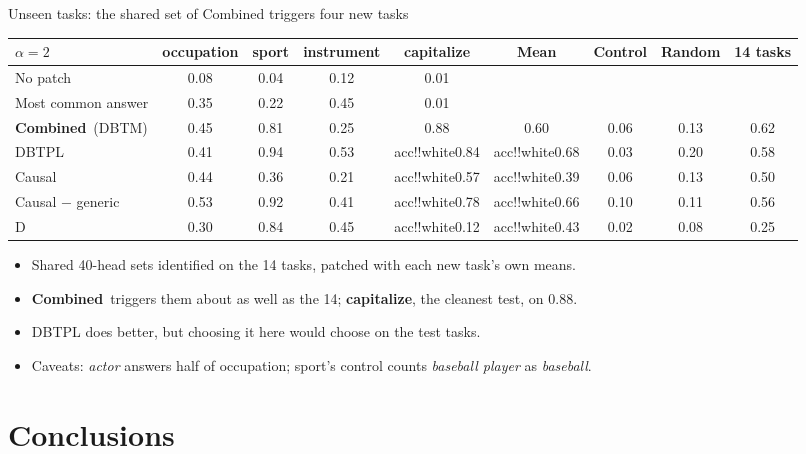 \documentclass[aspectratio=169,11pt,xcolor=table]{beamer}
\newcommand{\cv}[1]{\pgfmathtruncatemacro{\cvshade}{#1*70}\edef\cvcmd{\noexpand\cellcolor{acc!\cvshade!white}}\cvcmd#1}
\newcommand{\Sel}{\textcolor{cSel}{\textbf{Combined}}}
\newcommand{\Causal}{\textcolor{cCaus}{Causal}}
\newcommand{\CausalG}{\textcolor{cCausG}{Causal $-$ generic}}
\begin{document}
\begin{frame}{Unseen tasks: the shared set of Combined triggers four new tasks}
\centering\footnotesize\setlength{\tabcolsep}{4pt}
\begin{tabular}{@{}lccccc|ccc@{}}
\toprule
$\alpha=2$ & occupation & sport & instrument & capitalize & Mean & Control & Random & 14 tasks \\
\midrule
No patch & 0.08 & 0.04 & 0.12 & 0.01 & & & & \\
Most common answer & 0.35 & 0.22 & 0.45 & 0.01 & & & & \\
\midrule
\Sel\ (DBTM) & 0.45 & 0.81 & 0.25 & \cv{0.88} & \cv{0.60} & 0.06 & 0.13 & 0.62 \\
DBTPL & 0.41 & 0.94 & 0.53 & \cv{0.84} & \cv{0.68} & 0.03 & 0.20 & 0.58 \\
\Causal & 0.44 & 0.36 & 0.21 & \cv{0.57} & \cv{0.39} & 0.06 & 0.13 & 0.50 \\
\CausalG & 0.53 & 0.92 & 0.41 & \cv{0.78} & \cv{0.66} & 0.10 & 0.11 & 0.56 \\
D & 0.30 & 0.84 & 0.45 & \cv{0.12} & \cv{0.43} & 0.02 & 0.08 & 0.25 \\
\bottomrule
\end{tabular}

\vspace{0.6em}
\raggedright\small
\begin{itemize}
\item Shared 40-head sets identified on the 14 tasks, patched with each new task's own means.
\item \Sel\ triggers them about as well as the 14; \textbf{capitalize}, the cleanest test, on 0.88.
\item DBTPL does better, but choosing it here would choose on the test tasks.
\item Caveats: \emph{actor} answers half of occupation; sport's control counts \emph{baseball player} as \emph{baseball}.
\end{itemize}
\end{frame}

\section{Conclusions}
\end{document}
